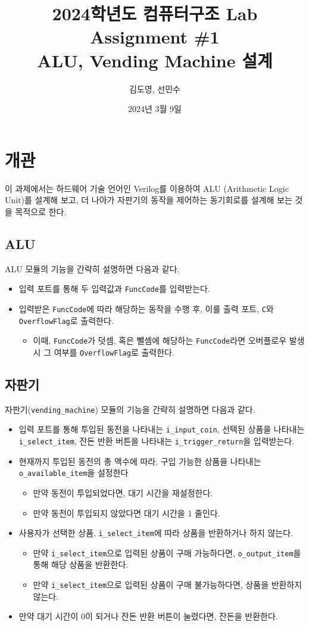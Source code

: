 \documentclass[openright, a4paper]{article}
\title{2024학년도 컴퓨터구조 Lab Assignment \#1\\
        ALU, Vending Machine 설계}
\author{김도영, 선민수}
\date{2024년 3월 9일}
\newcommand{\code}[1]{\texttt{#1}}
\begin{document}
\maketitle

\section{개관}
이 과제에서는 하드웨어 기술 언어인 Verilog를 이용하여 ALU
(Arithmetic Logic Unit)를 설계해 보고, 더 나아가 자판기의 동작을 제어하는 동기회로를
 설계해 보는 것을 목적으로 한다.

\subsection{ALU}
ALU 모듈의 기능을 간략히 설명하면 다음과 같다.
\begin{itemize}
    \item 입력 포트를 통해 두 입력값과 \code{FuncCode}를 입력받는다. 
    \item 입력받은 \code{FuncCode}에 따라 해당하는 동작을 수행 후, 이를 출력 포트, \code{C}와 \code{OverflowFlag}로 출력한다.
    \begin{itemize}
        \item 이때, \code{FuncCode}가 덧셈, 혹은 뺄셈에 해당하는 \code{FuncCode}라면 오버플로우 발생 시 그 여부를 \code{OverflowFlag}로 출력한다.
    \end{itemize}
\end{itemize}

\subsection{자판기}
자판기(\code{vending\_machine}) 모듈의 기능을 간략히 설명하면 다음과 같다.
\begin{itemize}
    \item 입력 포트를 통해 투입된 동전을 나타내는 \code{i_input_coin}, 선택된 상품을 나타내는 \code{i\_select\_item},
    잔돈 반환 버튼을 나타내는 \code{i\_trigger\_return}을 입력받는다.
    \item 현재까지 투입된 동전의 총 액수에 따라, 구입 가능한 상품을 나타내는 \code{o\_available\_item}을 설정한다
    \begin{itemize}
        \item 만약 동전이 투입되었다면, 대기 시간을 재설정한다.
        \item 만약 동전이 투입되지 않았다면 대기 시간을 1 줄인다.
    \end{itemize}
    \item 사용자가 선택한 상품, \code{i_select_item}에 따라 상품을 반환하거나 하지 않는다.
    \begin{itemize}
        \item 만약 \code{i_select_item}으로 입력된 상품이 구매 가능하다면, \code{o_output_item}을 통해 해당 상품을 반환한다.
        \item 만약 \code{i_select_item}으로 입력된 상품이 구매 불가능하다면, 상품을 반환하지 않는다.
    \end{itemize}
    \item 만약 대기 시간이 0이 되거나 잔돈 반환 버튼이 눌렸다면, 잔돈을 반환한다. 
\end{itemize}
\end{document}
